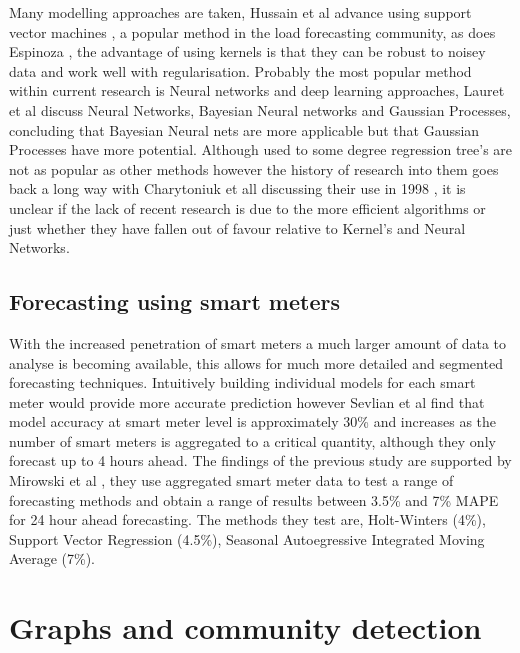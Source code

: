 Many modelling approaches are taken, Hussain et al advance using support vector machines \cite{Hussain2014}, a popular method in the load forecasting community, as does Espinoza \cite{Espinoza2007}, the advantage of using kernels is that they can be robust to noisey data and work well with regularisation. Probably the most popular method within current research is Neural networks and deep learning approaches, Lauret et al \cite{Lauret2012} discuss Neural Networks, Bayesian Neural networks and Gaussian Processes, concluding that Bayesian Neural nets are more applicable but that Gaussian Processes have more potential. Although used to some degree regression tree's are not as popular as other methods however the history of research into them goes back a long way with Charytoniuk et all discussing their use in 1998 \cite{Charytoniuk1998}, it is unclear if the lack of recent research is due to the more efficient algorithms or just whether they have fallen out of favour relative to Kernel's and Neural Networks. 

\subsection{Forecasting using smart meters}
\label{sec:forcesmart}
With the increased penetration of smart meters a much larger amount of data to analyse is becoming available, this allows for much more detailed and segmented forecasting techniques. Intuitively building individual models for each smart meter would provide more accurate prediction however Sevlian et al \cite{kavousian2013} find that model accuracy at smart meter level is approximately 30\% and increases as the number of smart meters is aggregated to a critical quantity, although they only forecast up to 4 hours ahead. The findings of the previous study are supported by Mirowski et al \cite{mirowski2014}, they use aggregated smart meter data to test a range of forecasting methods and obtain a range of results between 3.5\% and 7\% MAPE for 24 hour ahead forecasting. The methods they test are, Holt-Winters (4\%), Support Vector Regression (4.5\%), Seasonal Autoegressive Integrated Moving Average (7\%).

\section{Graphs and community detection}
\label{sec:commdetect}

